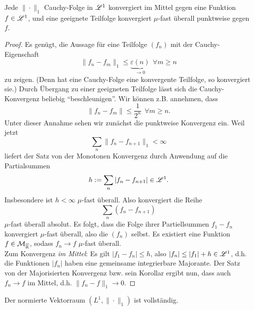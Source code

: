 \begin{satz}
\begin{mdframed}
Jede $\|\cdot\|_1$ Cauchy-Folge in $\mathscr{L}^1$ konvergiert im Mittel gegen eine Funktion $f\in \mathscr{L}^1$, und eine geeignete Teilfolge konvergiert $\mu$-fast überall punktweise gegen $f$.
\end{mdframed}
\begin{proof}
Es genügt, die Aussage für eine Teilfolge $(f_n)$ mit der Cauchy-Eigenschaft
$$\|f_n-f_m\|_1\leq \underbrace{\varepsilon(n)}_{\longrightarrow 0} \ \ \forall m\geq n$$ zu zeigen. (Denn hat eine Cauchy-Folge eine konvergente Teilfolge, so konvergiert sie.) Durch Übergang zu einer geeigneten Teilfolge lässt sich die Cauchy-Konvergenz beliebig ``beschleunigen''. Wir können z.B. annehmen, dass
$$\|f_n-f_m\|\leq \frac{1}{2^n} \ \ \forall m\geq n.$$
Unter dieser Annahme sehen wir zunächst die punktweise Konvergenz ein. Weil jetzt
$$\sum_n \|f_n-f_{n+1}\|_1 < \infty$$
liefert der Satz von der Monotonen Konvergenz durch Anwendung auf die Partialsummen
$$h:= \sum_n |f_n-f_{n+1}| \in \mathscr{L}^1.$$
Insbesondere ist $h < \infty$ $\mu$-fast überall. Also konvergiert die Reihe $$\sum_n (f_n-f_{n+1})$$
$\mu$-fast überall absolut. Es folgt, dass die Folge ihrer Partiellsummen $f_1-f_n$ konvergiert $\mu$-fast überall, also die $(f_n)$ selbst. Es existiert eine Funktion $f\in \mathcal{M}_{\overline{\mathbb{R}}}$, sodass $f_n \to f$ $\mu$-fast überall.\vspace{0.3pc}\\
Zum Konvergenz \emph{im Mittel}: Es gilt $|f_1-f_n|\leq h$, also $|f_n|\leq |f_1|+h \in \mathscr{L}^1$, d.h. die Funktionen $|f_n|$ haben eine gemeinsame integrierbare Majorante. Der Satz von der Majorisierten Konvergenz bzw. sein Korollar ergibt nun, dass auch $f_n \to f$ im Mittel, d.h. $\| f_n-f \|_1\to 0$.
\end{proof}
\end{satz}

\begin{korollar}
\begin{mdframed}
Der normierte Vektorraum $(L^1,\|\cdot\|_1)$ ist vollständig.
\end{mdframed}
\end{korollar}

